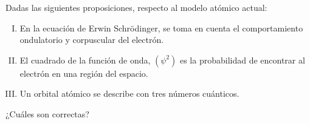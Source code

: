 Dadas las siguientes proposiciones, respecto al modelo atómico actual:
\begin{enumerate}[I.]
	\item En la ecuación de Erwin Schrödinger, se toma en cuenta el comportamiento ondulatorio y corpuscular del electrón.
	\item El cuadrado de la función de onda, $ (\psi^2) $ es la probabilidad de encontrar al electrón en una región del espacio.
	\item Un orbital atómico se describe con tres números cuánticos.
\end{enumerate}
¿Cuáles son correctas?
